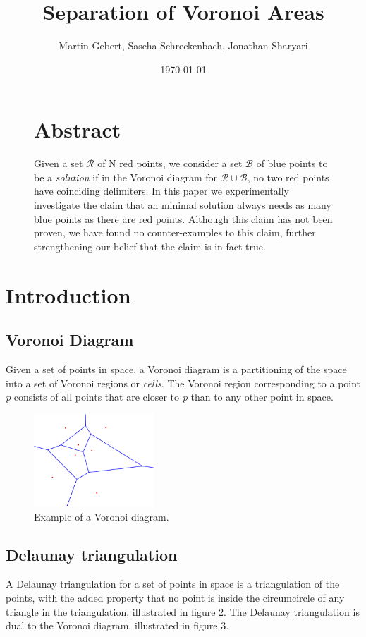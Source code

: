 \documentclass[a4paper,12pt]{article}
\title{\textbf{Separation of Voronoi Areas}}
\author{Martin Gebert, Sascha Schreckenbach, Jonathan Sharyari}  %
\date{\today}
\begin{document}
\maketitle

\begin{figure}
\section*{\large Abstract}
Given a set $\mathcal{R}$ of N red points, we consider a set  $\mathcal{B}$ of blue points to be a \emph{solution} if in the Voronoi diagram for  $\mathcal{R}\cup\mathcal{B}$, no two red points have coinciding delimiters. In this paper we experimentally investigate the claim that an minimal solution always needs as many blue points as there are red points. Although this claim has not been proven, we have found no counter-examples to this claim, further strengthening our belief that the claim is in fact true.
\end{figure}
\newpage

\tableofcontents
\newpage

\section{Introduction}
\subsection{Voronoi Diagram}
Given a set of points in space, a Voronoi diagram is a partitioning of the space into a set of Voronoi regions or \emph{cells}. The Voronoi region corresponding to a point \emph{p} consists of all points that are closer to \emph{p} than to any other point in space.

\begin{figure}[hb]
\centering
\includegraphics[width=0.4\textwidth]{pictures/Voronoi-diagram.png}
 \caption[Close up of \textit{Hemidactylus} sp.]
{Example of a Voronoi diagram.}
\end{figure}

\subsection{Delaunay triangulation}
A Delaunay triangulation for a set of points in space is a triangulation of the points, with the added property that no point is inside the circumcircle of any triangle in the triangulation, illustrated in figure 2. The Delaunay triangulation is dual to the Voronoi diagram, illustrated in figure 3.
\end{document}
